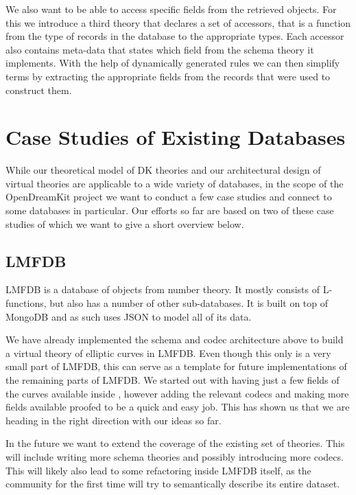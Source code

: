 \documentclass{deliverablereport}
\begin{document}
We also want to be able to access specific fields from the retrieved objects. For this we introduce a third theory that declares a set of accessors, that is a function from the type of records in the database to the appropriate types. Each accessor also contains meta-data that states which field from the schema theory it implements. With the help of dynamically generated rules we can then simplify terms by extracting the appropriate fields from the records that were used to construct them.

\section{Case Studies of Existing Databases}\label{sec:cases}

While our theoretical model of DK theories and our architectural design of virtual theories are applicable to a wide variety of databases, in the scope of the OpenDreamKit project we want to conduct a few case studies and connect to some databases in particular. Our efforts so far are based on two of these case studies of which we want to give a short overview below.

\subsection{LMFDB}\label{sec:lmfdb}

LMFDB \cite{lmfdb} is a database of objects from number theory. It mostly consists of L-functions, but also has a number of other sub-databases. It is built on top of MongoDB and as such uses JSON to model all of its data.

We have already implemented the schema and codec architecture above to build a virtual theory of elliptic curves in LMFDB. Even though this only is a very small part of LMFDB, this can serve as a template for future implementations of the remaining parts of LMFDB. We started out with having just a few fields of the curves available inside \MMT, however adding the relevant codecs and making more fields available proofed to be a quick and easy job. This has shown us that we are heading in the right direction with our ideas so far.

In the future we want to extend the coverage of the existing set of theories. This will include writing more schema theories and possibly introducing more codecs. This will likely also lead to some refactoring inside LMFDB itself, as the community for the first time will try to semantically describe its entire dataset.
\end{document}
